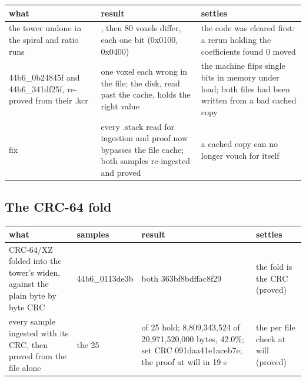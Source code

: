 {\small
\setlength{\tabcolsep}{6pt}
\begin{longtable}{>{\RaggedRight\arraybackslash}p{}>{\RaggedRight\arraybackslash}p{}>{\RaggedRight\arraybackslash}p{}}
\toprule
what & result & settles \\
\midrule
\endhead
the tower undone in the spiral and ratio runs & 180, then 80 voxels differ, each one bit (0x0100, 0x0400) & the code was cleared first: a rerun holding the coefficients found 0 moved \\
44b6\_\allowbreak{}0b24845f and 44b6\_\allowbreak{}341df25f, re-proved from their .kcr & one voxel each wrong in the file; the disk, read past the cache, holds the right value & the machine flips single bits in memory under load; both files had been written from a bad cached copy \\
fix & every .stack read for ingestion and proof now bypasses the file cache; both samples re-ingested and proved & a cached copy can no longer vouch for itself \\
\bottomrule
\end{longtable}
}

\subsection{\texorpdfstring{The CRC-64 fold}{The CRC-64 fold}}

{\footnotesize
\setlength{\tabcolsep}{6pt}
\begin{longtable}{>{\RaggedRight\arraybackslash}p{}>{\RaggedRight\arraybackslash}p{}>{\RaggedRight\arraybackslash}p{}>{\RaggedRight\arraybackslash}p{}}
\toprule
what & samples & result & settles \\
\midrule
\endhead
CRC-64/XZ folded into the tower's widen, against the plain byte by byte CRC & 44b6\_\allowbreak{}0113de3b & both 363bf8bdffac8f29 & the fold is the CRC (proved) \\
every sample ingested with its CRC, then proved from the file alone & the 25 & 25 of 25 hold; 8,809,343,524 of 20,971,520,000 bytes, 42.0\%; set CRC 091daa41e1aceb7e; the proof at will in 19 s & the per file check at will (proved) \\
\bottomrule
\end{longtable}
}

